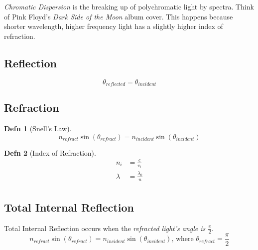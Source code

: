 \documentclass[10pt,letterpaper,final,twoside,notitlepage]{article}
\numberwithin{equation}{section} %
\theoremstyle{definition}
\newtheorem{definition}{Defn}
\theoremstyle{remark}
\begin{document}
\emph{Chromatic Dispersion} is the breaking up of polychromatic light by spectra.
Think of Pink Floyd's \textit{Dark Side of the Moon} album cover.
This happens because shorter wavelength, higher frequency light has a slightly higher index of refraction.

	\subsection*{Reflection} \label{subsec:Reflection}
		\begin{equation} \label{eq:Reflected Light}
			\theta_{reflected} = \theta_{incident}
		\end{equation}
		
	\subsection*{Refraction} \label{subsec:Refraction}
		\begin{definition}[Snell's Law] \label{def:Snell's Law}
			\begin{equation} \label{eq:Refracted Light} 
				n_{refract} \sin \left( \theta_{refract} \right) = n_{incident} \sin \left( \theta_{incident} \right)
			\end{equation}
		\end{definition}
		\begin{definition}[Index of Refraction] \label{def:Index of Refraction}
			\begin{equation} \label{eq:Index of Refraction}
				\begin{aligned}
					n_{i} &= \frac{c}{v_{i}} \\
					\lambda &= \frac{\lambda_{0}}{n} \\
				\end{aligned}
			\end{equation}
		\end{definition}
	
	\subsection*{Total Internal Reflection} \label{subsec:Total Internal Reflection}
		Total Internal Reflection occurs when the \emph{refracted light's angle is $\frac{\pi}{2}$}.
		\begin{equation} \label{eq:Total Internal Reflection}
			n_{refract} \sin \left( \theta_{refract} \right) = n_{incident} \sin \left( \theta_{incident} \right) \text{, where } \theta_{refract} = \frac{\pi}{2}
		\end{equation}
		
\end{document}
